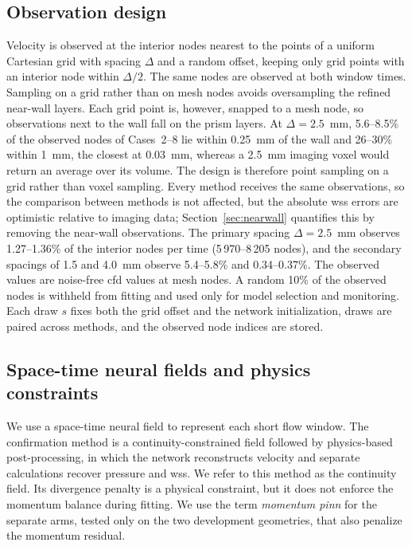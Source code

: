 \documentclass[12pt,a4paper]{article}
\newcommand{\CFD}{\ac{cfd}\xspace}
\newcommand{\PINN}{\ac{pinn}\xspace}
\newcommand{\WSS}{\ac{wss}\xspace}
\theoremstyle{definition}
\numberwithin{equation}{section}
\begin{document}
\subsection{Observation design}
\label{sec:observations}
Velocity is observed at the interior nodes nearest to the points of a uniform Cartesian grid with spacing $\Delta$ and a random offset, keeping only grid points with an interior node within $\Delta/2$. The same nodes are observed at both window times. Sampling on a grid rather than on mesh nodes avoids oversampling the refined near-wall layers. Each grid point is, however, snapped to a mesh node, so observations next to the wall fall on the prism layers. At $\Delta=2.5$~mm, 5.6--8.5\% of the observed nodes of Cases~2--8 lie within 0.25~mm of the wall and 26--30\% within 1~mm, the closest at 0.03~mm, whereas a 2.5~mm imaging voxel would return an average over its volume. The design is therefore point sampling on a grid rather than voxel sampling. Every method receives the same observations, so the comparison between methods is not affected, but the absolute \WSS errors are optimistic relative to imaging data; Section~\ref{sec:nearwall} quantifies this by removing the near-wall observations. The primary spacing $\Delta=2.5$~mm observes 1.27--1.36\% of the interior nodes per time (5\,970--8\,205 nodes), and the secondary spacings of 1.5 and 4.0~mm observe 5.4--5.8\% and 0.34--0.37\%. The observed values are noise-free \CFD values at mesh nodes. A random 10\% of the observed nodes is withheld from fitting and used only for model selection and monitoring. Each draw $s$ fixes both the grid offset and the network initialization, draws are paired across methods, and the observed node indices are stored.


\subsection{Space-time neural fields and physics constraints}
\label{sec:field}
We use a space-time neural field to represent each short flow window. The confirmation method is a continuity-constrained field followed by physics-based post-processing, in which the network reconstructs velocity and separate calculations recover pressure and \WSS. We refer to this method as the continuity field. Its divergence penalty is a physical constraint, but it does not enforce the momentum balance during fitting. We use the term \emph{momentum \PINN} for the separate arms, tested only on the two development geometries, that also penalize the momentum residual. 
\end{document}
